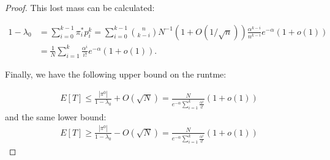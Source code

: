 \documentclass{article}
\begin{document}
\begin{proof}
This lost mass can be calculated:

\begin{align*}
  1 - \lambda_0 &= \sum\limits_{i = 0}^{k - 1} \pi_i^* p_i^k = \sum\limits_{i = 0}^{k - 1} \binom{n}{k - i}N^{-1}(1 + O(1/\sqrt{n})) \frac{\alpha^{k - i}}{n^{k - i}}e^{-\alpha} (1 + o(1)) \\
  &= \frac{1}{N} \sum\limits_{i = 1}^{k} \frac{\alpha^i}{i!}e^{-\alpha} (1 + o(1)).
\end{align*}

Finally, we have the following upper bound on the runtme:

\begin{align*}
  E[T] \le \frac{|\pi^0|}{1 - \lambda_0} + O(\sqrt{N}) = \frac{N}{e^{-\alpha} \sum\limits_{i = 1}^k \frac{\alpha^i}{i!}} (1 + o(1))
\end{align*}
and the same lower bound:
\begin{align*}
  E[T] \ge \frac{|\pi^0|}{1 - \lambda_0} - O(\sqrt{N}) = \frac{N}{e^{-\alpha} \sum\limits_{i = 1}^k \frac{\alpha^i}{i!}} (1 + o(1))
\end{align*}

\end{proof}
\end{document}
